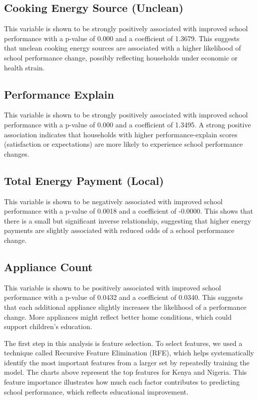 \documentclass[journal=jacsat,manuscript=article]{achemso}
\begin{document}
\subsection{Cooking Energy Source (Unclean)}
This variable is shown to be strongly positively associated with improved school performance with a p-value of 0.000 and a coefficient of 1.3679. This suggests that unclean cooking energy sources are associated with a higher likelihood of school performance change, possibly reflecting households under economic or health strain.

\subsection{Performance Explain}
This variable is shown to be strongly positively associated with improved school performance with a p-value of 0.000 and a coefficient of 1.3495. A strong positive association indicates that households with higher performance-explain scores (satisfaction or expectations) are more likely to experience school performance changes. 

\subsection{Total Energy Payment (Local)}
This variable is shown to be negatively associated with improved school performance with a p-value of 0.0018 and a coefficient of -0.0000. This shows that there is a small but significant inverse relationship, suggesting that higher energy payments are slightly associated with reduced odds of a school performance change.

\subsection{Appliance Count}
This variable is shown to be positively associated with improved school performance with a p-value of 0.0432 and a coefficient of 0.0340. This suggests that each additional appliance slightly increases the likelihood of a performance change. More appliances might reflect better home conditions, which could support children's education.

The first step in this analysis is feature selection. To select features, we used a technique called Recursive Feature Elimination (RFE), which helps systematically identify the most important features from a larger set by repeatedly training the model. The charts above represent the top features for Kenya and Nigeria. This feature importance illustrates how much each factor contributes to predicting school performance, which reflects educational improvement.
\end{document}
